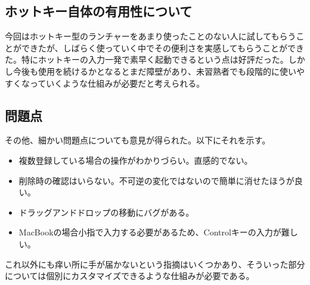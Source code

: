 \subsection{ホットキー自体の有用性について}
今回はホットキー型のランチャーをあまり使ったことのない人に試してもらうことができたが、しばらく使っていく中でその便利さを実感してもらうことができた。特にホットキーの入力一発で素早く起動できるという点は好評だった。しかし今後も使用を続けるかとなるとまだ障壁があり、未習熟者でも段階的に使いやすくなっていくような仕組みが必要だと考えられる。

\subsection{問題点}
その他、細かい問題点についても意見が得られた。以下にそれを示す。
\begin{itemize}
  \item 複数登録している場合の操作がわかりづらい。直感的でない。
  \item 削除時の確認はいらない。不可逆の変化ではないので簡単に消せたほうが良い。
  \item ドラッグアンドドロップの移動にバグがある。
  \item MacBookの場合小指で入力する必要があるため、Controlキーの入力が難しい。
\end{itemize}
これ以外にも痒い所に手が届かないという指摘はいくつかあり、そういった部分については個別にカスタマイズできるような仕組みが必要である。